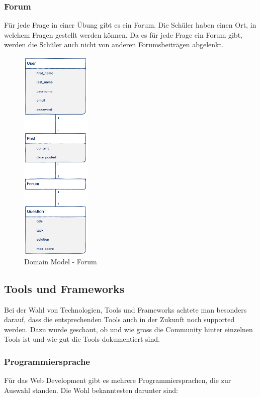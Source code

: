 \newpage
\subsubsection*{Forum}
Für jede Frage in einer Übung gibt es ein Forum. Die Schüler haben einen Ort, in welchem Fragen gestellt werden können. Da es für jede Frage ein Forum gibt, werden die Schüler auch nicht von anderen Forumsbeiträgen abgelenkt.
\begin{figure}[H]
\begin{center}
	\includegraphics[width=0.3\textwidth, keepaspectratio]{images/domain_model_forum.png}
	\caption{Domain Model - Forum}
	\label{fig:domain_model_forum}
\end{center}
\end{figure}


\subsection{Tools und Frameworks}
Bei der Wahl von Technologien, Tools und Frameworks achtete man besonders darauf, dass die entsprechenden Tools auch in der Zukunft noch supported werden. Dazu wurde geschaut, ob und wie gross die Community hinter einzelnen Tools ist und wie gut die Tools dokumentiert sind.

\subsubsection*{Programmiersprache}
Für das Web Development gibt es mehrere Programmiersprachen, die zur Auswahl standen. Die Wohl bekanntesten darunter sind:

